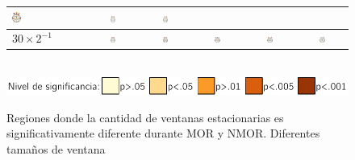 \begin{figure}
{\begin{tabular}{lccccc}
\includegraphics[width=0.13\textwidth]{./img_art_dfa/cabeza_new_RRU_30.pdf} &
\includegraphics[width=0.13\textwidth]{./img_art_dfa/cabeza_new_JGZ_30.pdf} &
\includegraphics[width=0.13\textwidth]{./img_art_dfa/cabeza_new_AEFP_30.pdf} \\
\midrule
$30 \times 2^{-1}$ &
\includegraphics[width=0.13\textwidth]{./img_art_dfa/cabeza_new_CLO_15.pdf} &
\includegraphics[width=0.13\textwidth]{./img_art_dfa/cabeza_new_RLO_15.pdf} &
\includegraphics[width=0.13\textwidth]{./img_art_dfa/cabeza_new_RRU_15.pdf} &
\includegraphics[width=0.13\textwidth]{./img_art_dfa/cabeza_new_JGZ_15.pdf} &
\includegraphics[width=0.13\textwidth]{./img_art_dfa/cabeza_new_AEFP_15.pdf} \\
\bottomrule
\end{tabular} \\
\includegraphics[scale=.7]{./img_art_dfa/escala.pdf} \\
}
\caption{Regiones donde la cantidad  de ventanas estacionarias es significativamente diferente
durante MOR y NMOR. Diferentes tamaños de ventana}
\end{figure}

